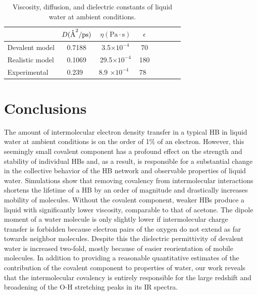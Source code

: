 \documentclass[aps,prl,reprint,amsmath,amssymb]{revtex4-1}
\begin{document}
\begin{table}
\caption{Viscosity, diffusion, and dielectric constants of liquid water at ambient conditions.}\label{Tab:dfs}
\begin{tabular}{l*{6}{c}r}
\hline
               & $D (\mathring{\text{A}}^2/\text{ps})$ & $\eta (\text{Pa}\cdot \text{s})$ & $\epsilon$ \\
\hline
Devalent model                & 0.7188 & 3.5$\times 10^{-4}$ & 70 \\
%
Realistic model              & 0.1069 & 29.5$\times 10^{-4}$ & 180 \\
%
Experimental            & 0.239~\cite{hardy2001isotope}  & 8.9 $\times 10^{-4} $~\cite{harris2004temperature} & 78~\cite{haynes2014crc}
\end{tabular}
\end{table}
 
\section{Conclusions}

The amount of intermolecular electron density transfer in a typical HB in liquid water at ambient conditions is on the order of 1\% of an electron. 
However, this seemingly small covalent component has a profound effect on the strength and stability of individual HBs and, as a result, is responsible for a substantial change in the collective behavior of the HB network and observable properties of liquid water. 
Simulations show that removing covalency from intermolecular interactions shortens the lifetime of a HB by an order of magnitude and drastically increases mobility of molecules. 
Without the covalent component, weaker HBs produce a liquid with significantly lower viscosity, comparable to that of acetone. 
The dipole moment of a water molecule is only slightly lower if intermolecular charge transfer is forbidden because electron pairs of the oxygen do not extend as far towards neighbor molecules. 
Despite this the dielectric permittivity of devalent water is increased two-fold, mostly because of easier reorientation of mobile molecules. 
In addition to providing a reasonable quantitative estimates of the contribution of the covalent component to properties of water, our work reveals that the intermolecular covalency is entirely responsible for the large redshift and broadening of the O-H stretching peaks in its IR spectra. 
\end{document}
